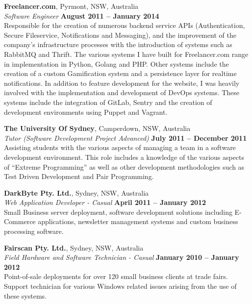 \documentclass[margin,line]{resume}
\begin{document}
\begin{resume}
    \textbf{Freelancer.com}, Pyrmont, NSW, Australia \vspace{2mm}\\\vspace{1mm}%
    \textsl{Software Engineer} \hfill \textbf{August 2011 -- January 2014}\\
    Responsible for the creation of numerous backend service APIs (Authentication, Secure Fileservice, Notifications and Messaging),
    and the improvement of the company's infrastructure processes with the introduction of systems such as
    RabbitMQ and Thrift. The various systems I have built for Freelancer.com range in implementation in Python, Golang and PHP.
    Other systems include the creation of a custom Gamification system and a persistence layer for realtime notifications. 
    In addition to feature development for the website, I was heavily involved with the implementation and development of DevOps systems. 
    These systems include the integration of GitLab, Sentry and the creation of development environments using Puppet and Vagrant.
   
    \textbf{The University Of Sydney}, Camperdown, NSW, Australia \vspace{2mm}\\\vspace{1mm}%
    \textsl{Tutor (Software Development Project Advanced)} \hfill \textbf{July 2011 -- December 2011}\\
    Assisting students with the various aspects of managing a team in a software development environment.
    This role includes a knowledge of the various aspects of ``Extreme Programming'' as well as other development
    methodologies such as Test Driven Development and Pair Programming.

    \textbf{DarkByte Pty. Ltd.}, Sydney, NSW, Australia \vspace{2mm}\\\vspace{1mm}%
    \textsl{Web Application Developer - Casual} \hfill \textbf{April 2011 -- January 2012}\\
    Small Business server deployment, software development solutions including E-Commerce applications,
    newsletter management systems and custom business processing software.	

\newpage

    \textbf{Fairscan Pty. Ltd.}, Sydney, NSW, Australia \vspace{2mm}\\\vspace{1mm}%
    \textsl{Field Hardware and Software Technician - Casual} \hfill \textbf{January 2010 -- January 2012}\\
    Point-of-sale deployments for over 120 small business clients at trade fairs. Support technician for various Windows
    related issues arising from the use of these systems.


\end{resume}
\end{document}
